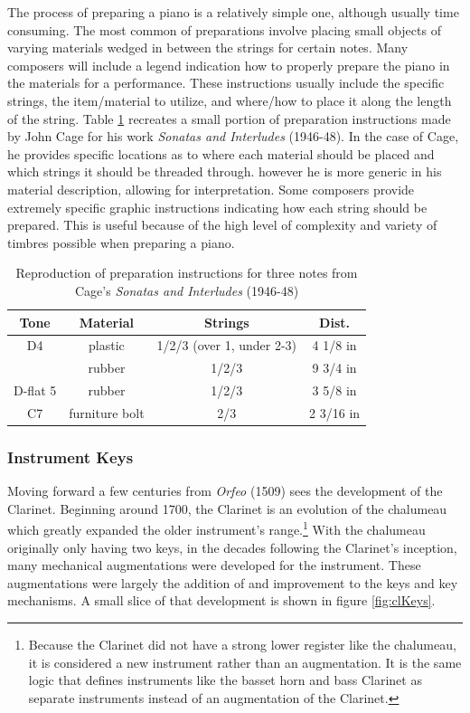 The process of preparing a piano is a relatively simple one, although usually time consuming\cite{ppVideo}. The most common of preparations involve placing small objects of varying materials wedged in between the strings for certain notes\cite{ppArticle}. Many composers will include a legend indication how to properly prepare the piano in the materials for a performance. These instructions usually include the specific strings, the item/material to utilize, and where/how to place it along the length of the string. Table \ref{fig:siPrep} recreates a small portion of preparation instructions made by John Cage for his work \textit{Sonatas and Interludes} (1946-48). In the case of Cage, he provides specific locations as to where each material should be placed and which strings it should be threaded through. however he is more generic in his material description, allowing for interpretation\cite{ppVideo}. Some composers provide extremely specific graphic instructions indicating how each string should be prepared\cite{ppArticle}. This is useful because of the high level of complexity and variety of timbres possible when preparing a piano\cite{ppVideo}.

\begin{table}[]
    \centering
    \begin{tabular}{|c||c|c|c|}
    \hline
        Tone   & Material & Strings & Dist. \\
        \hline
         D4 & plastic & 1/2/3 (over 1, under 2-3) & 4 1/8 in \\
                  & rubber & 1/2/3 & 9 3/4 in \\
                  \hline
         D-flat 5 & rubber & 1/2/3 & 3 5/8 in \\   
         \hline
         C7 & furniture bolt & 2/3 & 2 3/16 in \\
         \hline
    \end{tabular}
    \caption{Reproduction of preparation instructions for three notes from Cage's \textit{Sonatas and Interludes} (1946-48)}
    \label{fig:siPrep}
\end{table}

\subsubsection{Instrument Keys}

Moving forward a few centuries from \textit{Orfeo} (1509) sees the development of the Clarinet. Beginning around 1700, the Clarinet is an evolution of the chalumeau\cite{clHist} which greatly expanded the older instrument's range.\footnote{Because the Clarinet did not have a strong lower register like the chalumeau, it is considered a new instrument rather than an augmentation. It is the same logic that defines instruments like the basset horn and bass Clarinet as separate instruments instead of an augmentation of the Clarinet.} With the chalumeau originally only having two keys, in the decades following the Clarinet's inception, many mechanical augmentations were developed for the instrument. These augmentations were largely the addition of and improvement to the keys and key mechanisms. A small slice of that development is shown in figure \ref{fig:clKeys}. 

